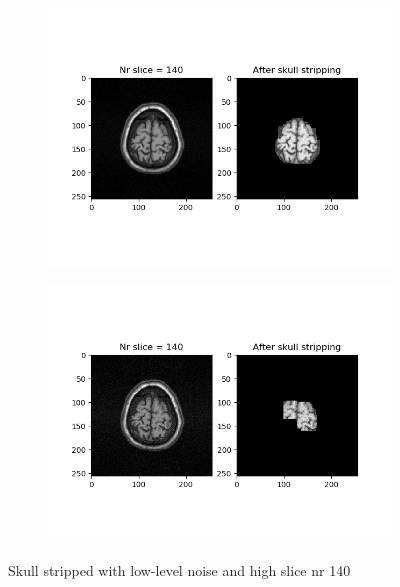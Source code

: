 \begin{figure}[H]
	\centering
	\begin{subfigure}[b]{0.35\linewidth}
		\includegraphics[scale=0.35]{figures/Module_08/M8_15.png}
	\end{subfigure}
		\begin{subfigure}[b]{0.35\linewidth}
		\includegraphics[scale=0.35]{figures/Module_08/M8_n15.png}
	\end{subfigure}
	\caption{Skull stripped with low-level noise and high slice nr 140}
	\label{fig:figures/m08_15}
\end{figure}

